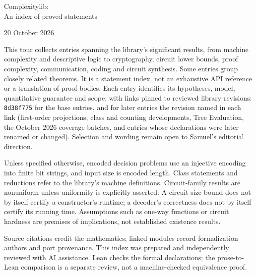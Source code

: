 \documentclass[11pt]{article}
\begin{document}
\begin{center}
{\LARGE Complexitylib:\\[.2em]An index of proved statements\par}
\vspace{.5em}
20 October 2026
\end{center}
This tour collects  entries spanning the library's significant results, from
machine complexity and descriptive logic to cryptography, circuit lower bounds,
proof complexity, communication, coding and circuit synthesis. Some entries group
closely related theorems. It is a statement index, not an exhaustive API reference
or a translation of proof bodies. Each entry identifies its hypotheses, model,
quantitative guarantee and scope, with links pinned to reviewed library revisions: \texttt{8d38f775} for the
base entries, and for later entries the revision named in each link (first-order
projections, class and counting developments, Tree Evaluation, the October 2026
coverage batches, and entries whose declarations were later renamed or changed). Selection and wording remain open
to Samuel's editorial direction.

Unless specified otherwise, encoded decision problems use an injective encoding
into finite bit strings, and input size is encoded length. Class statements and
reductions refer to the library's machine definitions. Circuit-family results are
nonuniform unless uniformity is explicitly asserted. A circuit-size bound does
not by itself certify a constructor's runtime; a decoder's correctness does not
by itself certify its running time. Assumptions such as one-way functions or
circuit hardness are premises of implications, not established existence results.

Source citations credit the mathematics; linked modules record formalization
authors and port provenance. This index was prepared and independently reviewed
with AI assistance. Lean checks the formal declarations; the prose-to-Lean
comparison is a separate review, not a machine-checked equivalence proof.

\setcounter{tocdepth}{1}
\tableofcontents
\clearpage

\begingroup
\raggedright


\endgroup
\end{document}
